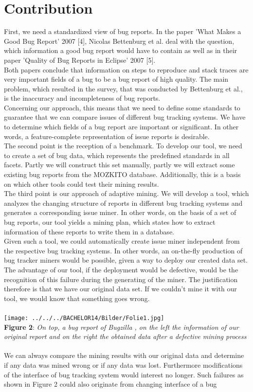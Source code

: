 \documentclass[12pt,a4paper,final]{article}
\begin{document}
\section{Contribution}First, we need a standardized view of bug reports. In the paper 'What Makes a Good Bug Report' 2007 [4], Nicolas Bettenburg et al. deal with the question, which information a good bug report would have to contain as well as in their paper 'Quality of Bug Reports in Eclipse' 2007 [5]. \\ Both papers conclude that information on steps to reproduce and stack traces are very important fields of a bug to be a bug report of high quality. The main problem, which resulted in the survey, that was conducted by Bettenburg et al., is the inaccuracy and incompleteness of bug reports. \\ Concerning our approach, this means that we need to define some standards to guarantee that we can compare issues of different bug tracking systems. We have to determine which fields of a bug report are important or significant. In other words, a feature-complete representation of issue reports is desirable. \\ The second point is the reception of a benchmark. To develop our tool, we need to create a set of bug data, which represents the predefined standards in all facets. Partly we will construct this set manually, partly we will extract some existing bug reports from the MOZKITO database. Additionally, this is a basis on which other tools could test their mining results. \\ The third point is our approach of adaptive mining. We will develop a tool, which analyzes the changing structure of reports in different bug tracking systems and generates a corresponding issue miner.  In other words, on the basis of a set of bug reports, our tool yields a mining plan, which states how to extract information of these reports to write them in a database. \\ Given such a tool, we could automatically create issue miner independent from the respective bug tracking systems. In other words, an on-the-fly production of bug tracker miners would be possible, given a way to deploy our created data set. The advantage of our tool, if the deployment would be defective, would be the recognition of this failure during the generating of the miner. The justification therefore is that we have our original data set. If we couldn't mine it with our tool, we would know that something goes wrong. \\ \\ \texttt{[image: ../../../BACHELOR14/Bilder/Folie1.jpg]}   \\\textbf{Figure 2}: \textit{On top, a bug report of Bugzilla , on the left the information of our original report and on the right the obtained data after a defective mining process} \\ \\ We can always compare the mining results with our original data and determine if any data was mined wrong or if any data was lost. Furthermore modifications of the interface of bug tracking system would interest no longer. Such failures as shown in Figure 2 could also originate from changing interface of a bug 
\end{document}
